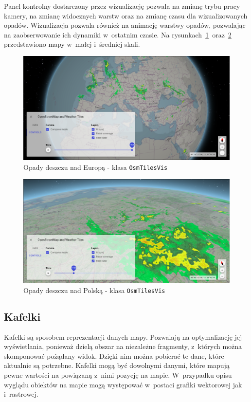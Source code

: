 Panel kontrolny dostarczony przez wizualizację pozwala na zmianę trybu pracy kamery, na zmianę widocznych warstw oraz na zmianę czasu dla wizualizowanych opadów. Wizualizacja pozwala również na animację warstwy opadów, pozwalając na zaobserwowanie ich dynamiki w~ostatnim czasie. Na rysunkach~\ref{fig:c4_osmTilesVis}~oraz~\ref{fig:c4_osmTilesVis_1} przedstawiono mapy w~małej i~średniej skali.
\begin{figure}[h]
  \centering
  \includegraphics[width=\linewidth]{img/c4_osmTilesVis.png}
  \caption{Opady deszczu nad Europą - klasa \texttt{OsmTilesVis}}
  \label{fig:c4_osmTilesVis} 
\end{figure}

\begin{figure}[h]
  \centering
  \includegraphics[width=\linewidth]{img/c4_osmTilesVis_1.png}
  \caption{Opady deszczu nad Polską - klasa \texttt{OsmTilesVis}}
  \label{fig:c4_osmTilesVis_1} 
\end{figure}

\subsection{Kafelki}
Kafelki są sposobem reprezentacji danych mapy. Pozwalają na optymalizację jej wyświetlania, ponieważ dzielą obszar na niezależne fragmenty, z~których można skomponować pożądany widok. Dzięki nim można pobierać te dane, które aktualnie są potrzebne. Kafelki mogą być dowolnymi danymi, które mapują pewne wartości na powiązaną z~nimi pozycję na mapie. W~przypadku opisu wyglądu obiektów na mapie mogą występować w~postaci grafiki wektorowej jak i~rastrowej.

